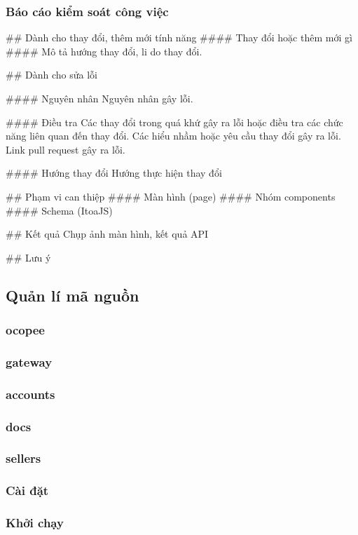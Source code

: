 \subsubsection{Báo cáo kiểm soát công việc}

\#\# Dành cho thay đổi, thêm mới tính năng
\#\#\#\# Thay đổi hoặc thêm mới gì
\#\#\#\# Mô tả hướng thay đổi, li do thay đổi.

\#\# Dành cho sửa lỗi

\#\#\#\# Nguyên nhân
Nguyên nhân gây lỗi.

\#\#\#\# Điều tra
Các thay đổi trong quá khứ gây ra lỗi hoặc điều tra các chức năng liên quan đến thay đổi.
Các hiểu nhầm hoặc yêu cầu thay đổi gây ra lỗi.
Link pull request gây ra lỗi.

\#\#\#\# Hướng thay đổi
Hướng thực hiện thay đổi

\#\# Phạm vi can thiệp
\#\#\#\# Màn hình (page)
\#\#\#\# Nhóm components
\#\#\#\# Schema (ItoaJS)

\#\# Kết quả
Chụp ảnh màn hình, kết quả API

\#\# Lưu ý


\subsection{Quản lí mã nguồn}
\subsubsection{ocopee}
\subsubsection{gateway}
\subsubsection{accounts}
\subsubsection{docs}
\subsubsection{sellers}
\subsubsection{Cài đặt}
\subsubsection{Khởi chạy}

